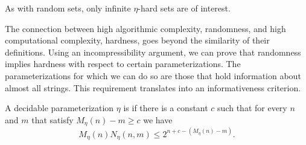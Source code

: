 As with random sets, only infinite $\eta$-hard sets are of interest.

The connection between high algorithmic complexity, randomness, and high computational complexity, hardness, goes beyond the similarity of their definitions.
Using an incompressibility argument, we can prove that randomness implies hardness with respect to certain parameterizations.
The parameterizations for which we can do so are those that hold information about almost all strings.
This requirement translates into an informativeness criterion.
\begin{definition}
\label{def:informative}
  A decidable parameterization $\eta$ is  if there is a constant $c$ such that for every $n$ and $m$ that satisfy $M_\eta(n) - m \ge c$ we have
\begin{equation*}
  M_\eta(n) N_\eta(n, m) \le 2^{n + c - (M_\eta(n) - m)}.
\end{equation*}
\end{definition}

